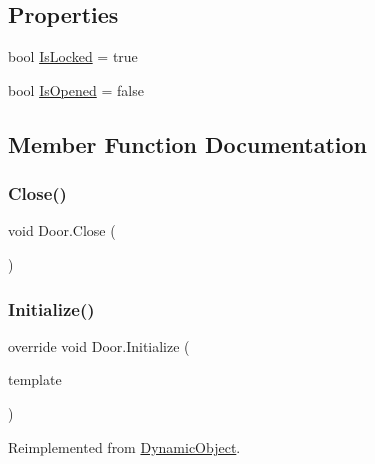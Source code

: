 \subsection*{Properties}
\begin{DoxyCompactItemize}
\item 
bool \mbox{\hyperlink{class_door_a1c9886fb6a29176e7b1921912bedc528}{Is\+Locked}} = true
\item 
bool \mbox{\hyperlink{class_door_ad1cf34da4066c4081f0aa46007d649b9}{Is\+Opened}} = false
\end{DoxyCompactItemize}


\subsection{Member Function Documentation}
\mbox{\label{class_door_a4ee490d221509a60073df05c186df9e6}} 
\subsubsection{\texorpdfstring{Close()}{Close()}}
{\footnotesize\ttfamily void Door.\+Close (\begin{DoxyParamCaption}{ }\end{DoxyParamCaption})}

\mbox{\label{class_door_acb583e1e2040bb093c035ec0fa03d273}} 
\subsubsection{\texorpdfstring{Initialize()}{Initialize()}}
{\footnotesize\ttfamily override void Door.\+Initialize (\begin{DoxyParamCaption}\item[{\mbox{\hyperlink{class_dynamic_object_template}{Dynamic\+Object\+Template}}}]{template }\end{DoxyParamCaption})\hspace{0.3cm}{\ttfamily [virtual]}}



Reimplemented from \mbox{\hyperlink{class_dynamic_object_a51dc678c061bc3a5eb60c3d96a1ef506}{Dynamic\+Object}}.


